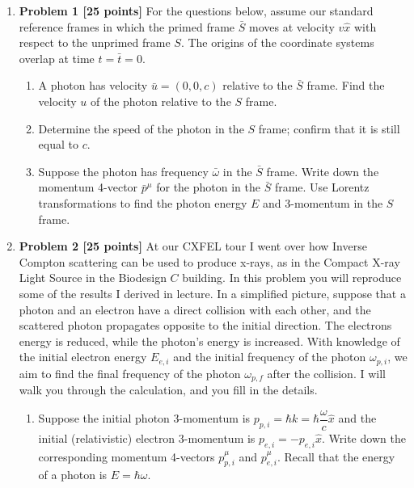 \documentclass[fleqn]{article}
\begin{document}
  \begin{enumerate}
    \item \textbf{Problem 1 [25 points]}
    For the questions below, assume our standard reference frames in which the primed frame $\bar{S}$
    moves at velocity $v \hat{x}$ with respect to the unprimed frame $S$. The origins of the coordinate 
    systems overlap at time $t=\bar{t}=0$.
    \begin{enumerate}
      \item A photon has velocity $\bar{u}=(0,0,c)$ relative to the $\bar{S}$ frame. Find the velocity $u$
      of the photon relative to the $S$ frame.

      \item Determine the speed of the photon in the $S$ frame; confirm that it is still equal to $c$.

      \item Suppose the photon has frequency $\bar{\omega}$ in the $\bar{S}$ frame. Write down the momentum
      4-vector $\bar{p}^{\mu}$ for the photon in the $\bar{S}$ frame. Use Lorentz transformations to find the 
      photon energy $E$ and 3-momentum in the $S$ frame.
    \end{enumerate}

    \pagebreak



    \item \textbf{Problem 2 [25 points]}
    At our CXFEL tour I went over how Inverse Compton scattering can be used to produce x-rays, as
    in the Compact X-ray Light Source in the Biodesign $C$ building. In this problem you will reproduce
    some of the results I derived in lecture. In a simplified picture, suppose that a photon and an electron
    have a direct collision with each other, and the scattered photon propagates opposite to the initial
    direction. The electrons energy is reduced, while the photon’s energy is increased. With knowledge
    of the initial electron energy $E_{e,i}$ and the initial frequency of the photon $\omega_{p, i}$, we aim 
    to find the final frequency of the photon $\omega_{p,f}$ after the collision. I will walk you through the 
    calculation, and you fill in the details.
    \begin{enumerate}
      \item Suppose the initial photon 3-momentum is $p_{p,i}=\hbar k=\hbar \dfrac{\omega}{c} \hat{x}$
      and the initial (relativistic) electron 3-momentum is $p_{e,i}=-p_{e,i} \hat{x}$. Write down the 
      corresponding momentum 4-vectors $p^{\mu}_{p,i}$ and $p^{\mu}_{e,i}$. Recall that the energy of a 
      photon is $E=\hbar \omega$.


\end{enumerate}
\end{enumerate}
\end{document}
